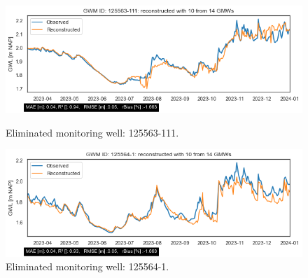 \begin{figure}[h]
    \centering
    \begin{minipage}{0.48\linewidth}
        \includegraphics[width=\linewidth]{frontmatter/Heijplaat-fig/125563111heij.png}
        \caption{Eliminated monitoring well: 125563-111.}
        \label{hwell1}
    \end{minipage}
    \hfill
    \begin{minipage}{0.48\linewidth}
        \includegraphics[width=\linewidth]{frontmatter/Heijplaat-fig/1255641heij.png}
        \caption{Eliminated monitoring well: 125564-1.}
        \label{125564-1}
    \end{minipage}
    

\end{figure}
